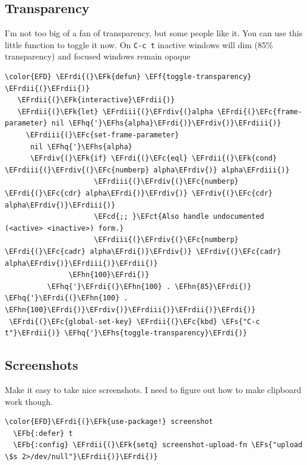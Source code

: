\documentclass{scrartcl}
\newcommand{\EFk}[1]{\textcolor{EFk}{#1}} %
\newcommand{\EFs}[1]{\textcolor{EFs}{#1}} %
\newcommand{\EFb}[1]{\textcolor{EFb}{#1}} %
\newcommand{\EFct}[1]{\textcolor{EFct}{#1}} %
\newcommand{\EFc}[1]{\textcolor{EFc}{#1}} %
\newcommand{\EFf}[1]{\textcolor{EFf}{#1}} %
\newcommand{\EFcd}[1]{\textcolor{EFcd}{#1}} %
\newcommand{\EFhn}[1]{\textcolor{EFhn}{\textbf{#1}}} %
\newcommand{\EFhq}[1]{\textcolor{EFhq}{#1}} %
\newcommand{\EFhs}[1]{\textcolor{EFhs}{#1}} %
\newcommand{\EFrdi}[1]{\textcolor{EFrdi}{#1}} %
\newcommand{\EFrdii}[1]{\textcolor{EFrdii}{#1}} %
\newcommand{\EFrdiii}[1]{\textcolor{EFrdiii}{#1}} %
\newcommand{\EFrdiv}[1]{\textcolor{EFrdiv}{#1}} %
\begin{document}
\subsection{Transparency}
\label{sec:org4b9f33f}
I'm not too big of a fan of transparency, but some people like it. You can use
this little function to toggle it now. On \texttt{C-c t} inactive windows will dim (85\%
transparency)  and focused windows remain opaque
\begin{Code}
\begin{Verbatim}[]
\color{EFD} \EFrdi{(}\EFk{defun} \EFf{toggle-transparency} \EFrdii{(}\EFrdii{)}
   \EFrdii{(}\EFk{interactive}\EFrdii{)}
   \EFrdii{(}\EFk{let} \EFrdiii{(}\EFrdiv{(}alpha \EFrdi{(}\EFc{frame-parameter} nil \EFhq{'}\EFhs{alpha}\EFrdi{)}\EFrdiv{)}\EFrdiii{)}
     \EFrdiii{(}\EFc{set-frame-parameter}
      nil \EFhq{'}\EFhs{alpha}
      \EFrdiv{(}\EFk{if} \EFrdi{(}\EFc{eql} \EFrdii{(}\EFk{cond} \EFrdiii{(}\EFrdiv{(}\EFc{numberp} alpha\EFrdiv{)} alpha\EFrdiii{)}
                     \EFrdiii{(}\EFrdiv{(}\EFc{numberp} \EFrdi{(}\EFc{cdr} alpha\EFrdi{)}\EFrdiv{)} \EFrdiv{(}\EFc{cdr} alpha\EFrdiv{)}\EFrdiii{)}
                     \EFcd{;; }\EFct{Also handle undocumented (<active> <inactive>) form.}
                     \EFrdiii{(}\EFrdiv{(}\EFc{numberp} \EFrdi{(}\EFc{cadr} alpha\EFrdi{)}\EFrdiv{)} \EFrdiv{(}\EFc{cadr} alpha\EFrdiv{)}\EFrdiii{)}\EFrdii{)}
               \EFhn{100}\EFrdi{)}
          \EFhq{'}\EFrdi{(}\EFhn{100} . \EFhn{85}\EFrdi{)} \EFhq{'}\EFrdi{(}\EFhn{100} . \EFhn{100}\EFrdi{)}\EFrdiv{)}\EFrdiii{)}\EFrdii{)}\EFrdi{)}
 \EFrdi{(}\EFc{global-set-key} \EFrdii{(}\EFc{kbd} \EFs{"C-c t"}\EFrdii{)} \EFhq{'}\EFhs{toggle-transparency}\EFrdi{)}
\end{Verbatim}
\end{Code}

\subsection{Screenshots}
\label{sec:org7579126}
Make it easy to take nice screenshots. I need to figure out how to make
clipboard work though.
\begin{Code}
\begin{Verbatim}[]
\color{EFD}\EFrdi{(}\EFk{use-package!} screenshot
  \EFb{:defer} t
  \EFb{:config} \EFrdii{(}\EFk{setq} screenshot-upload-fn \EFs{"upload \$s 2>/dev/null"}\EFrdii{)}\EFrdi{)}
\end{Verbatim}
\end{Code}
\end{document}
